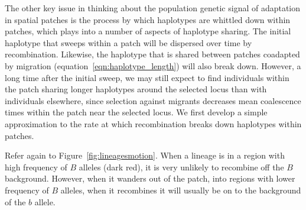 \documentclass{article}
\newcommand{\citep}[1]{\cite{#1}}
\begin{document}
The other key issue in thinking about the population genetic signal of adaptation in spatial patches 
is the process by which haplotypes are whittled down within patches, 
which plays into a number of aspects of haplotype sharing. 
The initial haplotype that sweeps within a patch 
will be dispersed over time by recombination.
Likewise, the haplotype that is shared between patches coadapted by migration
(equation~\ref{eqn:haplotype_length}) will also break down. 
However, a long time after the initial sweep,
we may still expect to find individuals within the patch sharing longer haplotypes around the selected locus
than with individuals elsewhere,
since selection against migrants 
decreases mean coalescence times within the patch near the selected locus.  %
We first develop a simple approximation to the rate 
at which recombination breaks down haplotypes within patches. 

Refer again to Figure~\ref{fig:lineagesmotion}. 
When a lineage is in a region with high frequency of $B$ alleles (dark red), 
it is very unlikely to recombine off the $B$ background. 
However, when it wanders out of the patch,
into regions with lower frequency of $B$ alleles,
when it recombines it will
usually be on to the background of the $b$ allele.
\end{document}
